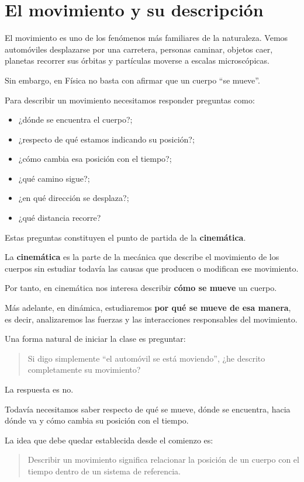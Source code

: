 ﻿\section{El movimiento y su descripción}

El movimiento es uno de los fenómenos más familiares de la naturaleza.
Vemos automóviles desplazarse por una carretera, personas caminar, objetos
caer, planetas recorrer sus órbitas y partículas moverse a escalas
microscópicas.

Sin embargo, en Física no basta con afirmar que un cuerpo ``se mueve''.

Para describir un movimiento necesitamos responder preguntas como:

\begin{itemize}
    \item ¿dónde se encuentra el cuerpo?;
    \item ¿respecto de qué estamos indicando su posición?;
    \item ¿cómo cambia esa posición con el tiempo?;
    \item ¿qué camino sigue?;
    \item ¿en qué dirección se desplaza?;
    \item ¿qué distancia recorre?
\end{itemize}

Estas preguntas constituyen el punto de partida de la
\textbf{cinemática}.

\begin{definicion}[Cinemática]
La \textbf{cinemática} es la parte de la mecánica que describe el movimiento
de los cuerpos sin estudiar todavía las causas que producen o modifican ese
movimiento.
\end{definicion}

Por tanto, en cinemática nos interesa describir \textbf{cómo se mueve} un
cuerpo.

Más adelante, en dinámica, estudiaremos \textbf{por qué se mueve de esa
manera}, es decir, analizaremos las fuerzas y las interacciones responsables
del movimiento.

\begin{notapedagogica}
Una forma natural de iniciar la clase es preguntar:

\begin{quote}
Si digo simplemente ``el automóvil se está moviendo'', ¿he descrito
completamente su movimiento?
\end{quote}

La respuesta es no.

Todavía necesitamos saber respecto de qué se mueve, dónde se encuentra,
hacia dónde va y cómo cambia su posición con el tiempo.

La idea que debe quedar establecida desde el comienzo es:

\begin{quote}
Describir un movimiento significa relacionar la posición de un cuerpo con
el tiempo dentro de un sistema de referencia.
\end{quote}
\end{notapedagogica}


